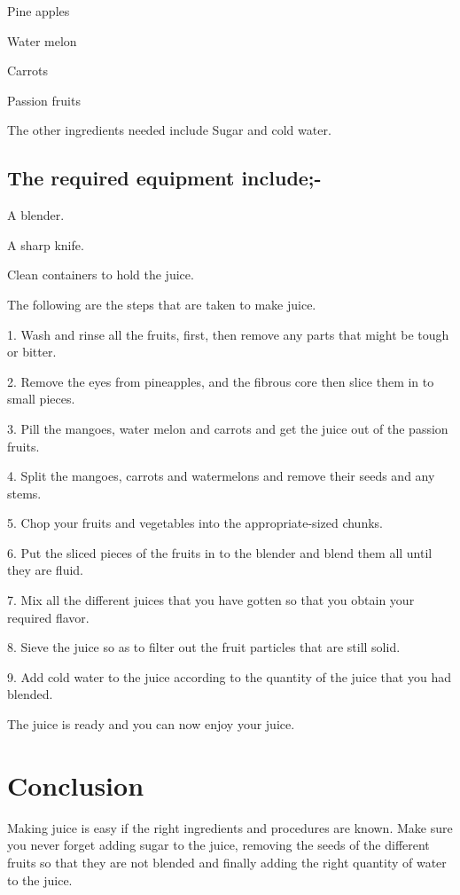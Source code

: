 \documentclass[options]{article}
\begin{document}
Pine apples 

Water melon 

Carrots 

Passion fruits 

The other ingredients needed include Sugar and cold water.

 \subsection{\textbf{The required equipment include;-}}  

A blender.

A sharp knife.

Clean containers to hold the juice. 

The following are the steps that are taken to make juice.

1.	Wash and rinse all the fruits, first, then remove any parts that might be tough or bitter.

2.	Remove the eyes from pineapples, and the fibrous core then slice them in to small pieces.

3.	Pill the mangoes, water melon and carrots and get the juice out of the passion fruits.

4.	Split the mangoes, carrots and watermelons and remove their seeds and any stems.

5.	Chop your fruits and vegetables into the appropriate-sized chunks.

6.	Put the sliced pieces of the fruits in to the blender and blend them all until they are fluid.

7.	Mix all the different juices that you have gotten so that you obtain your required flavor.

8.	Sieve the juice so as to filter out the fruit particles that are still solid.

9.	Add cold water to the juice according to the quantity of the juice that you had blended. 

The juice is ready and you can now enjoy your juice.

\section{\textbf{Conclusion }} 
Making juice is easy if the right ingredients and procedures are known. Make sure you never
 forget adding sugar to the juice, removing the seeds of the different fruits so that they are
 not blended and finally adding the right quantity of water to the juice.
\end{document}
